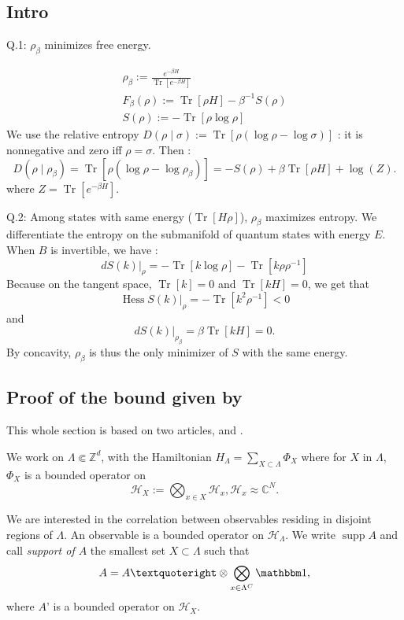 \documentclass[french]{article}
\DeclareMathOperator{\Tr}{Tr}
\DeclareMathOperator{\Hess}{Hess}
\DeclareMathOperator{\supp}{supp}
\begin{document}
\subsection{Intro}
Q.1: $\rho_\beta$ minimizes free energy.

\begin{eqnarray*}
   \rho_\beta:= \frac{e^{-\beta H}}{\Tr[e^{-\beta H}]}\\
F_\beta(\rho):=\Tr[\rho H]-\beta^{-1}S(\rho)\\
S(\rho):=-\Tr[\rho\log\rho]
\end{eqnarray*}
 We use the relative entropy $D(\rho\mid \sigma):=\Tr[\rho(\log \rho - \log  \sigma)]$ : it is nonnegative and zero iff $\rho=\sigma$.
 Then :
 $$
 D(\rho\mid\rho_\beta)=\Tr[\rho(\log\rho-\log\rho_\beta)]=-S(\rho)+\beta\Tr[\rho H]+\log(Z).
 $$
 where $Z=\Tr[e^{-\beta H}]$.
 
 Q.2: Among states with same energy ($\Tr[H\rho]$), $\rho_\beta$ maximizes entropy.
 We differentiate the entropy on the submanifold of quantum states with energy $E$.
 When $B$ is invertible, we have : $$
 dS(k)\vert_{\rho}=-\Tr[k\log \rho]-\Tr[k\rho\rho^{-1}]
 $$
 Because on the tangent space, $\Tr[k]=0$ and $\Tr[kH]=0$, we get that $$
 \Hess S(k)\vert_{\rho}=-\Tr[k^2\rho^{-1}]<0
 $$
 and $$
 dS(k)\vert_{\rho_\beta}=\beta\Tr[kH]=0.
 $$
 By concavity, $\rho_\beta$ is thus the only minimizer of $S$ with the same energy.
 
 \subsection{Proof of the bound given by \cite{froehlichPropertiesCorrelationsQuantum2015}}
 
 This whole section is based on two articles, \cite{froehlichPropertiesCorrelationsQuantum2015} and \cite{ueltschiClusterExpansionsCorrelation2005}.
 
 We work on $\Lambda\Subset \mathbb{Z}^d$, with the Hamiltonian $H_\Lambda=\sum_{X\subset \Lambda} \Phi_X$ where for $X$ in $\Lambda$, $\Phi_X$ is a bounded operator on $$\mathcal H_X:=\bigotimes_{x\in X}\mathcal H_x, \mathcal{H}_x\approx\mathbb C^N.$$
 
 We are interested in the correlation between observables residing in disjoint regions of $\Lambda$.
 An observable is a bounded operator on $\mathcal H_\Lambda$.
 We write $\supp A$ and call {\it support of $A$} the smallest set $X\subset \Lambda$ such that $$A=A’\otimes\bigotimes_{x\in \Lambda^C}\mathbbm 1,$$ where $A’$ is a bounded operator on $\mathcal H_X$.
 
\end{document}
